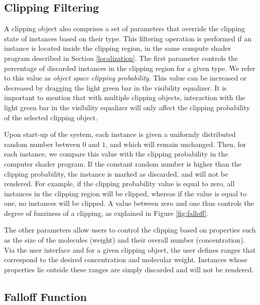 \subsection{Clipping Filtering} \label{ssec:clip_params}

A clipping object also comprises a set of parameters that override the clipping state of instances based on their type.
This filtering operation is performed if an instance is located inside the clipping region, in the same compute shader program described in Section \ref{localization}.
The first parameter controls the percentage of discarded instances in the clipping region for a given type.
We refer to this value as \emph{object space clipping probability}.
This value can be increased or decreased by dragging the light green bar in the visibility equalizer.
It is important to mention that with multiple clipping objects, interaction with the light green bar in the visibility equalizer will only affect the clipping probability of the selected clipping object.

Upon start-up of the system, each instance is given a uniformly distributed random number between $0$ and $1$, and which will remain unchanged.
Then, for each instance, we compare this value with the clipping probability in the computer shader program.
If the constant random number is higher than the clipping probability, the instance is marked as discarded, and will not be rendered. 
For example, if the clipping probability value is equal to zero, all instances in the clipping region will be clipped, whereas if the value is equal to one, no instances will be clipped.
A value between zero and one thus controls the degree of fuzziness of a clipping, as explained in Figure \ref{fig:falloff}.

The other parameters allow users to control the clipping based on properties such as the size of the molecules (weight) and their overall number (concentration).
Via the user interface and for a given clipping object, the user defines ranges that correspond to the desired concentration and molecular weight.
Instances whose properties lie outside these ranges are simply discarded and will not be rendered.

\subsection{Falloff Function}

